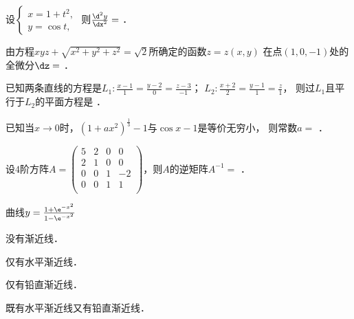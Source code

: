 \documentclass[plain,noanswer,medmath]{../../template/jnuexam}
\begin{document}




\begin{problem}
设$\begin{cases}
  x = 1 + t^2, \\
  y = \cos t,
\end{cases}$ 则$\frac{\d^2y}{\dx^2} =$ \fillin{}．
\end{problem}


\begin{problem}
由方程$xyz + \sqrt{x^2 + y^2 + z^2} = \sqrt{2}$所确定的函数$z = z(x,y)$
在点$(1,0, - 1)$处的全微分$\dz =$ \fillin{}．
\end{problem}


\begin{problem}
已知两条直线的方程是$L_1:\frac{x - 1}{1} = \frac{y - 2}{0} = \frac{z - 3}{-1}$；
$L_2:\frac{x + 2}{2} = \frac{y - 1}{1} = \frac{z}{1}$，
则过$L_1$且平行于$L_2$的平面方程是 \fillin{}．
\end{problem}


\begin{problem}
已知当$x \to 0$时，$(1 + ax^2)^{\frac{1}{3}} - 1$与$\cos x - 1$是等价无穷小，
则常数$a =$ \fillin{}．
\end{problem}


\begin{problem}
设$4$阶方阵$A=\begin{pmatrix}
 5 & 2 & 0 &  0 \\
 2 & 1 & 0 &  0 \\
 0 & 0 & 1 & -2 \\
 0 & 0 & 1 &  1 \\
\end{pmatrix}$，则$A$的逆矩阵$A^{-1}=$ \fillin{}．
\end{problem}




\begin{problem}
曲线$y = \frac{1 + \e^{- x^2}}{1 - \e^{- x^2}}$	\pickout{}
\begin{abcd*}
\item 没有渐近线．					
\item 仅有水平渐近线．
\item 仅有铅直渐近线．				
\item 既有水平渐近线又有铅直渐近线．
\end{abcd*}
\end{problem}
\end{document}
